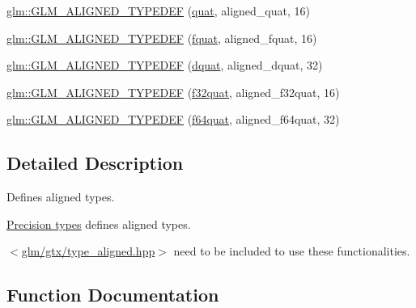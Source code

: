 \begin{DoxyCompactItemize}
\item 
\hyperlink{group__gtx__type__aligned_gafd945a8ea86b042aba410e0560df9a3d}{glm\+::\+G\+L\+M\+\_\+\+A\+L\+I\+G\+N\+E\+D\+\_\+\+T\+Y\+P\+E\+D\+EF} (\hyperlink{fwd_8hpp_ac1f6a5957091b849730ea6f05a6b7ad6}{quat}, aligned\+\_\+quat, 16)
\item 
\hyperlink{group__gtx__type__aligned_gad8c4bfacff70e57dc8303634c8bfce35}{glm\+::\+G\+L\+M\+\_\+\+A\+L\+I\+G\+N\+E\+D\+\_\+\+T\+Y\+P\+E\+D\+EF} (\hyperlink{fwd_8hpp_aa95d73f08018f3864c6ae08dbf1c59f2}{fquat}, aligned\+\_\+fquat, 16)
\item 
\hyperlink{group__gtx__type__aligned_gaabc28c84a3288b697605d4688686f9a9}{glm\+::\+G\+L\+M\+\_\+\+A\+L\+I\+G\+N\+E\+D\+\_\+\+T\+Y\+P\+E\+D\+EF} (\hyperlink{fwd_8hpp_a49693161673a003b4a8fd4d8b15b0b7b}{dquat}, aligned\+\_\+dquat, 32)
\item 
\hyperlink{group__gtx__type__aligned_ga1ed8aeb5ca67fade269a46105f1bf273}{glm\+::\+G\+L\+M\+\_\+\+A\+L\+I\+G\+N\+E\+D\+\_\+\+T\+Y\+P\+E\+D\+EF} (\hyperlink{group__gtc__type__precision_gac59c4d798396552e4bbb866b3d8a2f18}{f32quat}, aligned\+\_\+f32quat, 16)
\item 
\hyperlink{group__gtx__type__aligned_ga95cc03b8b475993fa50e05e38e203303}{glm\+::\+G\+L\+M\+\_\+\+A\+L\+I\+G\+N\+E\+D\+\_\+\+T\+Y\+P\+E\+D\+EF} (\hyperlink{group__gtc__type__precision_ga5b54d7b36fbee5e271f73e6ed74e7172}{f64quat}, aligned\+\_\+f64quat, 32)
\end{DoxyCompactItemize}


\subsection{Detailed Description}
Defines aligned types. 

\hyperlink{group__core__precision}{Precision types} defines aligned types.

$<$\hyperlink{gtx_2type__aligned_8hpp}{glm/gtx/type\+\_\+aligned.\+hpp}$>$ need to be included to use these functionalities. 

\subsection{Function Documentation}
\mbox{\label{group__gtx__type__aligned_gab5cd5c5fad228b25c782084f1cc30114}} 
